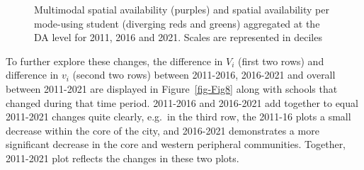\documentclass[
default
]{sn-jnl}
\begin{document}
\begin{figure}[H]


\caption{\label{fig-Fig7}Multimodal spatial availability (purples) and
spatial availability per mode-using student (diverging reds and greens)
aggregated at the DA level for 2011, 2016 and 2021. Scales are
represented in deciles}

\end{figure}%

To further explore these changes, the difference in \(V_i\) (first two
rows) and difference in \(v_i\) (second two rows) between 2011-2016,
2016-2021 and overall between 2011-2021 are displayed in
Figure~\ref{fig-Fig8} along with schools that changed during that time
period. 2011-2016 and 2016-2021 add together to equal 2011-2021 changes
quite clearly, e.g.~in the third row, the 2011-16 plots a small decrease
within the core of the city, and 2016-2021 demonstrates a more
significant decrease in the core and western peripheral communities.
Together, 2011-2021 plot reflects the changes in these two plots.
\end{document}

